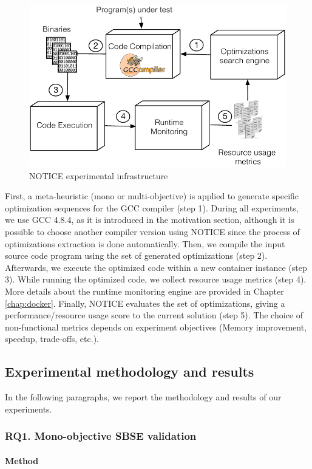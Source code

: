 \begin{figure}[h]
	\centering
	\includegraphics[width=0.7\linewidth]{chapitre3/fig/infraup.pdf}
	\caption{NOTICE experimental infrastructure}
	\label{settttini}	
\end{figure}

First, a meta-heuristic (mono or multi-objective) is applied to generate specific optimization sequences for the GCC compiler (step 1).
During all experiments, we use GCC 4.8.4, as it is introduced in the motivation section, although it is possible to choose another compiler version using NOTICE since the process of optimizations extraction is done automatically. 
Then, we compile the input source code program using the set of generated optimizations (step 2). Afterwards, we execute the optimized code within a new container instance (step 3). While running the optimized code, we collect resource usage metrics (step 4). More details about the runtime monitoring engine are provided in Chapter \ref{chap:docker}.
Finally, NOTICE evaluates the set of optimizations, giving a performance/resource usage score to the current solution (step 5). 
The choice of non-functional metrics depends on experiment objectives (Memory improvement, speedup, trade-offs, etc.).


\subsection{Experimental methodology and results}
In the following paragraphs, we report the methodology and results of our experiments.

\subsubsection{RQ1. Mono-objective SBSE validation}
\paragraph{Method}

